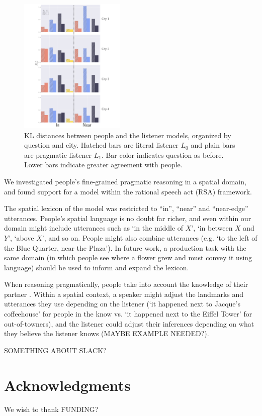 \documentclass[10pt,letterpaper]{article}
\begin{document}
\begin{figure}[!b]
\center
\includegraphics[width=0.45\textwidth]{figures/KL.pdf}
\caption{KL distances between people and the listener models, organized by question and city. Hatched bars are literal listener $L_0$ and plain bars are  pragmatic listener $L_1$. Bar color indicates question as before. Lower bars indicate greater agreement with people.}
\label{fig:KL}
\end{figure}

We investigated people's fine-grained pragmatic reasoning in a spatial domain, and found support for a model within the rational speech act (RSA) framework.  

The spatial lexicon of the model was restricted to ``in'', ``near'' and ``near-edge'' utterances. People's spatial language is no doubt far richer, and even within our domain might include utterances such as `in the middle of $X$', `in between $X$ and $Y$', `above $X$', and so on. People might also combine utterances (e.g. `to the left of the Blue Quarter, near the Plaza'). In future work, a production task with the same domain (in which people see where a flower grew and must convey it using language) should be used to inform and expand the lexicon. 

When reasoning pragmatically, people take into account the knowledge of their partner \cite{ndg+ast:topics2013}. Within a spatial context, a speaker might adjust the landmarks and utterances they use depending on the listener (`it happened next to Jacque's coffeehouse' for people in the know vs. `it happened next to the Eiffel Tower' for out-of-towners), and the listener could adjust their inferences depending on what they believe the listener knows (MAYBE EXAMPLE NEEDED?).

SOMETHING ABOUT SLACK? 


\section{Acknowledgments}

We wish to thank FUNDING?



\setlength{\bibleftmargin}{.125in}
\setlength{\bibindent}{-\bibleftmargin}

\end{document}
